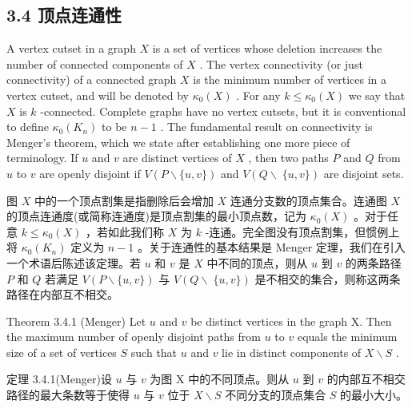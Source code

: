 \documentclass[10pt]{article}
\begin{document}
\begin{tcolorbox}\relax
\section*{3.4 顶点连通性}
\end{tcolorbox}

A vertex cutset in a graph \(X\) is a set of vertices whose deletion increases the number of connected components of \(X\) . The vertex connectivity (or just connectivity) of a connected graph \(X\) is the minimum number of vertices in a vertex cutset, and will be denoted by \({\kappa }_{0}\left( X\right)\) . For any \(k \leq  {\kappa }_{0}\left( X\right)\) we say that \(X\) is \(k\) -connected. Complete graphs have no vertex cutsets, but it is conventional to define \({\kappa }_{0}\left( {K}_{n}\right)\) to be \(n - 1\) . The fundamental result on connectivity is Menger's theorem, which we state after establishing one more piece of terminology. If \(u\) and \(v\) are distinct vertices of \(X\) , then two paths \(P\) and \(Q\) from \(u\) to \(v\) are openly disjoint if \(V\left( {P\smallsetminus \{ u,v\} }\right)\) and \(V(Q \smallsetminus \; \{ u,v\} )\) are disjoint sets.

\begin{tcolorbox}\relax
图 \(X\) 中的一个顶点割集是指删除后会增加 \(X\) 连通分支数的顶点集合。连通图 \(X\) 的顶点连通度(或简称连通度)是顶点割集的最小顶点数，记为 \({\kappa }_{0}\left( X\right)\) 。对于任意 \(k \leq  {\kappa }_{0}\left( X\right)\) ，若如此我们称 \(X\) 为 \(k\) -连通。完全图没有顶点割集，但惯例上将 \({\kappa }_{0}\left( {K}_{n}\right)\) 定义为 \(n - 1\) 。关于连通性的基本结果是 Menger 定理，我们在引入一个术语后陈述该定理。若 \(u\) 和 \(v\) 是 \(X\) 中不同的顶点，则从 \(u\) 到 \(v\) 的两条路径 \(P\) 和 \(Q\) 若满足 \(V\left( {P\smallsetminus \{ u,v\} }\right)\) 与 \(V(Q \smallsetminus \; \{ u,v\} )\) 是不相交的集合，则称这两条路径在内部互不相交。
\end{tcolorbox}

Theorem 3.4.1 (Menger) Let \(u\) and \(v\) be distinct vertices in the graph X. Then the maximum number of openly disjoint paths from \(u\) to \(v\) equals the minimum size of a set of vertices \(S\) such that \(u\) and \(v\) lie in distinct components of \(X \smallsetminus  S\) .

\begin{tcolorbox}\relax
定理 3.4.1(Menger)设 \(u\) 与 \(v\) 为图 X 中的不同顶点。则从 \(u\) 到 \(v\) 的内部互不相交路径的最大条数等于使得 \(u\) 与 \(v\) 位于 \(X \smallsetminus  S\) 不同分支的顶点集合 \(S\) 的最小大小。
\end{tcolorbox}
\end{document}

